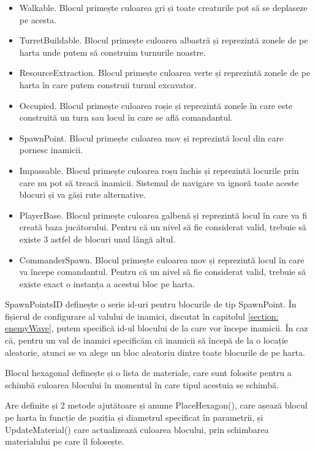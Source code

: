 \documentclass[12pt, a4paper]{article}
\begin{document}
	\begin{itemize}
		\item Walkable. Blocul primește culoarea gri și toate creaturile pot să se deplaseze pe acesta.
		\item TurretBuildable. Blocul primește culoarea albastră și reprezintă zonele de pe harta unde putem să construim turnurile noastre.
		\item ResourceExtraction. Blocul primește culoarea verte și reprezintă zonele de pe harta în care putem construii turnul excavator.
		\item Occupied. Blocul primește culoarea roșie și reprezintă zonele în care este construită un turn sau locul în care se află comandantul.
		\item SpawnPoint. Blocul primește culoarea mov și reprezintă locul din care pornesc inamicii.
		\item Impassable. Blocul primește culoarea roșu închis și reprezintă locurile prin care nu pot să treacă inamicii. Sistemul de navigare va ignoră toate aceste blocuri și va găși rute alternative.
		\item PlayerBase. Blocul primește culoarea galbenă și reprezintă locul în care va fi creată baza jucătorului. Pentru că un nivel să fie considerat valid, trebuie să existe 3 astfel de blocuri unul lângă altul.
		\item CommanderSpawn. Blocul primește culoarea mov și reprezintă locul în care va începe comandantul. Pentru că un nivel să fie considerat valid, trebuie să existe exact o instanța a acestui bloc pe harta.
	\end{itemize}
	
	SpawnPointsID definește o serie id-uri pentru blocurile de tip SpawnPoint. În fișierul de configurare al valului de inamici, discutat în capitolul \ref{section: enemyWave}, putem specifică id-ul blocului de la care vor începe inamicii. În caz că, pentru un val de inamici specificăm că inamicii să începă de la o locație aleatorie, atunci se va alege un bloc aleatoriu dintre toate blocurile de pe harta.
	\newline
	
	Blocul hexagonal definește și o lista de materiale, care sunt folosite pentru a schimbă culoarea blocului în momentul în care tipul acestuia se schimbă.
	\newline
	
	Are definite și 2 metode ajutătoare și anume PlaceHexagon(), care așează blocul pe harta în funcție de poziția și diametrul specificat în parametrii, și UpdateMaterial() care actualizează culoarea blocului, prin schimbarea materialului pe care îl folosește.
	\newline
	
\end{document}
